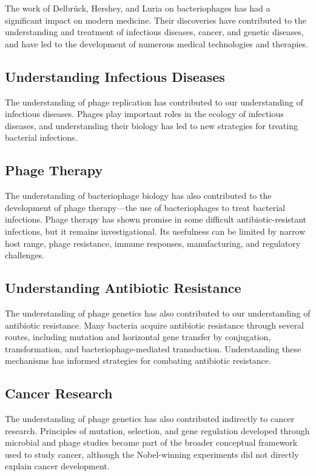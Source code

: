 The work of Delbr\"uck, Hershey, and Luria on bacteriophages has had a significant impact on modern medicine. Their discoveries have contributed to the understanding and treatment of infectious diseases, cancer, and genetic diseases, and have led to the development of numerous medical technologies and therapies.

\subsection{Understanding Infectious Diseases}

The understanding of phage replication has contributed to our understanding of infectious diseases. Phages play important roles in the ecology of infectious diseases, and understanding their biology has led to new strategies for treating bacterial infections.

\subsection{Phage Therapy}

The understanding of bacteriophage biology has also contributed to the development of phage therapy---the use of bacteriophages to treat bacterial infections. Phage therapy has shown promise in some difficult antibiotic-resistant infections, but it remains investigational. Its usefulness can be limited by narrow host range, phage resistance, immune responses, manufacturing, and regulatory challenges.

\subsection{Understanding Antibiotic Resistance}

The understanding of phage genetics has also contributed to our understanding of antibiotic resistance. Many bacteria acquire antibiotic resistance through several routes, including mutation and horizontal gene transfer by conjugation, transformation, and bacteriophage-mediated transduction. Understanding these mechanisms has informed strategies for combating antibiotic resistance.

\subsection{Cancer Research}

The understanding of phage genetics has also contributed indirectly to cancer research. Principles of mutation, selection, and gene regulation developed through microbial and phage studies became part of the broader conceptual framework used to study cancer, although the Nobel-winning experiments did not directly explain cancer development.

